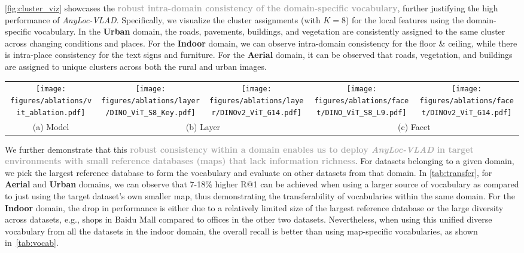 \documentclass[letterpaper, 10 pt, conference]{ieeeconf}  \fi
\newcommand{\urban}[1]{\textbf{\textcolor{OutdoorDark}{Urban}}}
\newcommand{\indoor}[1]{\textbf{\textcolor{IndoorDark}{Indoor}}}
\newcommand{\aerial}[1]{\textbf{\textcolor{AerialDark}{Aerial}}}
\newcommand{\highlight}[1]{\textcolor{darkgray}{\textbf{#1}}}
\newcommand{\coolaggshort}[1]{\textit{AnyLoc-{#1}}}
\newcommand{\dino}{\mbox{DINO}}
\newcommand{\dinovtwo}{\mbox{DINOv2}}
\begin{document}
\cref{fig:cluster_viz} showcases the \highlight{robust intra-domain consistency of the domain-specific vocabulary}, further justifying the high performance of \coolaggshort{VLAD}.
Specifically, we visualize the cluster assignments (with $K = 8$) for the local features using the domain-specific vocabulary.
In the \urban{} domain, the roads, pavements, buildings, and vegetation are consistently assigned to the same cluster across changing conditions and places. 
For the \indoor{} domain, we can observe intra-domain consistency for the floor \& ceiling, while there is intra-place consistency for the text signs and furniture.
For the \aerial{} domain, it can be observed that roads, vegetation, and buildings are assigned to unique clusters across both the rural and urban images.

\begin{figure*}[!t]
\centering
\begin{tabular}{ccccc}
\texttt{[image: figures/ablations/vit\_ablation.pdf]} 
&
\texttt{[image: figures/ablations/layer/DINO\_ViT\_S8\_Key.pdf]} 
&
\texttt{[image: figures/ablations/layer/DINOv2\_ViT\_G14.pdf]} 
&
\texttt{[image: figures/ablations/facet/DINO\_ViT\_S8\_L9.pdf]}
&
\texttt{[image: figures/ablations/facet/DINOv2\_ViT\_G14.pdf]} 
\\
(a) Model & \multicolumn{2}{c}{(b) Layer} & \multicolumn{2}{c}{(c) Facet}
\end{tabular}
\caption{\textbf{Design Choices for \coolaggshort{VLAD}}: (a) Performance scales with the model size but saturates at ViT-L.
(b) Performance peaks at intermediate layers instead of the final layer for both \dino{} \& \dinovtwo{}. (c) On average, \texttt{key} \& \texttt{value} perform the best respectively for \dino{} \& \dinovtwo{}.}
\label{fig:ablations}
\end{figure*}

We further demonstrate that this \highlight{robust consistency within a domain enables us to deploy \coolaggshort{VLAD} in target environments with small reference databases (maps) that lack information richness}.
For datasets belonging to a given domain, we pick the largest reference database to form the vocabulary and evaluate on other datasets from that domain. 
In \cref{tab:transfer}, for \aerial{} and \urban{} domains, we can observe that 7-18\% higher R@1 can be achieved when using a larger source of vocabulary as compared to just using the target dataset's own smaller map, thus demonstrating the transferability of vocabularies within the same domain. 
For the \indoor{} domain, the drop in performance is either due to a relatively limited size of the largest reference database or the large diversity across datasets, e.g., shops in Baidu Mall compared to offices in the other two datasets. Nevertheless, when using this unified diverse vocabulary from all the datasets in the indoor domain, the overall recall is better than using map-specific vocabularies, as shown in~\cref{tab:vocab}.
\end{document}
